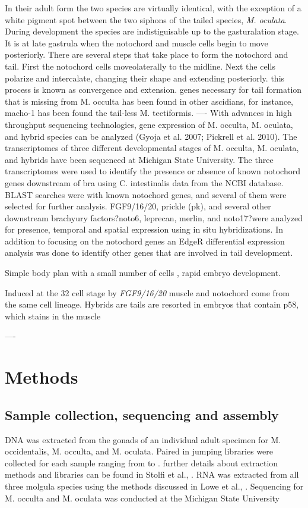 In their adult form the two species are virtually identical, with the exception of a white pigment spot between the two siphons of the tailed species, \textit{M. oculata}. During development the species are indistiguisable up to the gasturalation stage. It is at late gastrula when the notochord and muscle cells begin to move posteriorly. There are several steps that take place to form the notochord and tail. First the notochord cells moveolaterally to the midline. Next the cells polarize and intercalate, changing their shape and extending posteriorly. this process is known as convergence and extension. 
genes necessary for tail formation that is missing from M. occulta has been found in other ascidians, for instance, macho-1 has been found the tail-less M. tectiformis. 
----
With advances in high throughput sequencing technologies, gene expression of M. occulta, M. oculata, and hybrid species can be analyzed (Gyoja et al. 2007; Pickrell et al. 2010). The transcriptomes of three different developmental stages of M. occulta, M. oculata, and hybrids have been sequenced at Michigan State University. The three transcriptomes were used to identify the presence or absence of known notochord genes downstream of bra using C. intestinalis data from the NCBI database. BLAST searches were with known notochord genes, and several of them were selected for further analysis. FGF9/16/20, prickle (pk), and several other downstream brachyury factors?noto6, leprecan, merlin, and noto17?were analyzed for presence, temporal and spatial expression using in situ hybridizations. In addition to focusing on the notochord genes an EdgeR differential expression analysis was done to identify other genes that are involved in tail development.

Simple body plan with a small number of cells \cite{Satoh, 1994, 1999}, rapid embryo development.

Induced at the 32 cell stage by \textit{FGF9/16/20}
muscle and notochord come from the same cell lineage.
Hybrids are tails are resorted in embryos that contain p58, which stains in the muscle 
  
----
\section{Methods}
\subsection{Sample collection, sequencing and assembly}
DNA was extracted from the gonads of an individual adult specimen for M. occidentalis, M. occulta, and M. oculata. Paired in jumping libraries were collected for each sample ranging from  to . further details about extraction methods and libraries can be found in Stolfi et al., \cite{}. RNA was extracted from all three molgula species using the methods discussed in Lowe et al., \cite{}. Sequencing for M. occulta and M. oculata was conducted at the Michigan State University 



